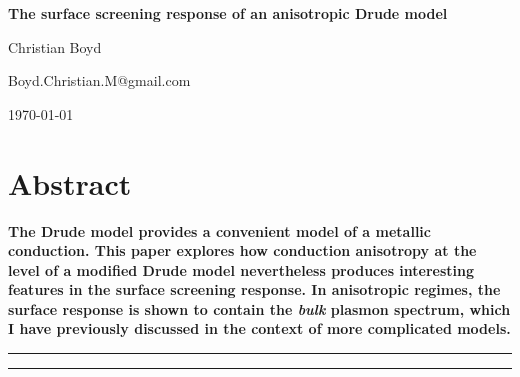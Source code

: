 \begin{center}{\Large \textbf{
The surface screening response of an anisotropic Drude model
}}\end{center}

\begin{center}
Christian Boyd
\end{center}

\begin{center}
{\small \sf Boyd.Christian.M@gmail.com}
\end{center}

\begin{center}
\today
\end{center}


\section*{Abstract}
{\bf
The Drude model provides a convenient model of a metallic conduction.  This paper explores how conduction anisotropy at the level of a modified Drude model nevertheless produces interesting features in the surface screening response.  In anisotropic regimes, the surface response is shown to contain the {\it bulk} plasmon spectrum, which I have previously discussed in the context of more complicated models.
}

\vspace{10pt}
\noindent\rule{\textwidth}{1pt}
\tableofcontents
\noindent\rule{\textwidth}{1pt}
\vspace{10pt}